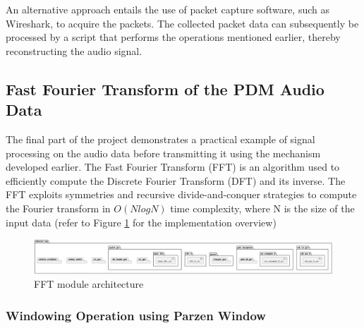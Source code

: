 An alternative approach entails the use of packet capture software, such as Wireshark, to acquire the packets. The collected packet data can subsequently be processed by a script that performs the operations mentioned earlier, thereby reconstructing the audio signal.


\subsection{Fast Fourier Transform of the PDM Audio Data}

The final part of the project demonstrates a practical example of signal processing on the audio data before transmitting it using the mechanism developed earlier. The Fast Fourier Transform (FFT) is an algorithm used to efficiently compute the Discrete Fourier Transform (DFT) and its inverse. The FFT exploits symmetries and recursive divide-and-conquer strategies to compute the Fourier transform in $O(N log N)$ time complexity, where N is the size of the input data
(refer to Figure \ref{fig:fft-mod-arch} for the implementation overview)

\begin{figure}
    \centering
    \includegraphics[width=1\linewidth]{Sections/IMPLEMENTATION/images/ModuleFFT.jpeg}
    \caption{FFT module architecture}
    \label{fig:fft-mod-arch}
\end{figure}



\subsubsection{Windowing Operation using Parzen Window}

